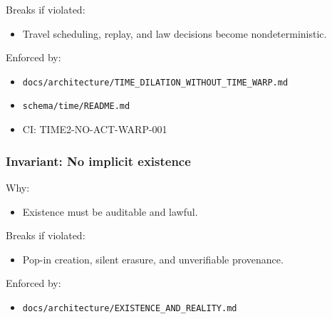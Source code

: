 \documentclass[9pt,a4paper,openany]{book}
\begin{document}
Breaks if violated:



\begin{itemize}
\item Travel scheduling, replay, and law decisions become nondeterministic.\allowbreak{}
\end{itemize}


Enforced by:



\begin{itemize}
\item \texttt{docs/\allowbreak{}architecture/\allowbreak{}TIME\_\allowbreak{}DILATION\_\allowbreak{}WITHOUT\_\allowbreak{}TIME\_\allowbreak{}WARP.\allowbreak{}md}
\end{itemize}


\begin{itemize}
\item \texttt{schema/\allowbreak{}time/\allowbreak{}README.\allowbreak{}md}
\end{itemize}


\begin{itemize}
\item CI: TIME2-\allowbreak{}NO-\allowbreak{}ACT-\allowbreak{}WARP-\allowbreak{}001
\end{itemize}





\subsubsection{Invariant: No implicit existence}


Why:



\begin{itemize}
\item Existence must be auditable and lawful.\allowbreak{}
\end{itemize}


Breaks if violated:



\begin{itemize}
\item Pop-\allowbreak{}in creation, silent erasure, and unverifiable provenance.\allowbreak{}
\end{itemize}


Enforced by:



\begin{itemize}
\item \texttt{docs/\allowbreak{}architecture/\allowbreak{}EXISTENCE\_\allowbreak{}AND\_\allowbreak{}REALITY.\allowbreak{}md}
\end{itemize}
\end{document}
